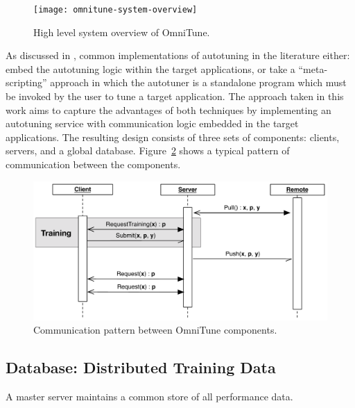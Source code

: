 
\begin{figure}
\centering
\texttt{[image: omnitune-system-overview]}
\caption{%
  High level system overview of OmniTune.%
}
\label{fig:omnitune-system-overview}
\end{figure}

As discussed in , common implementations of
autotuning in the literature either: embed the autotuning logic within
the target applications, or take a ``meta-scripting'' approach in
which the autotuner is a standalone program which must be invoked by
the user to tune a target application. The approach taken in this work
aims to capture the advantages of both techniques by implementing an
autotuning service with communication logic embedded in the target
applications. The resulting design consists of three sets of
components: clients, servers, and a global
database. Figure~\ref{fig:omnitune-comms} shows a typical pattern of
communication between the components.

\begin{figure}
\centering
\includegraphics[width=.8\textwidth]{img/omnitune-comms}
\caption{%
  Communication pattern between OmniTune components.%
}
\label{fig:omnitune-comms}
\end{figure}



\subsection{Database: Distributed Training Data}

A master server maintains a common store of all performance
data. 


